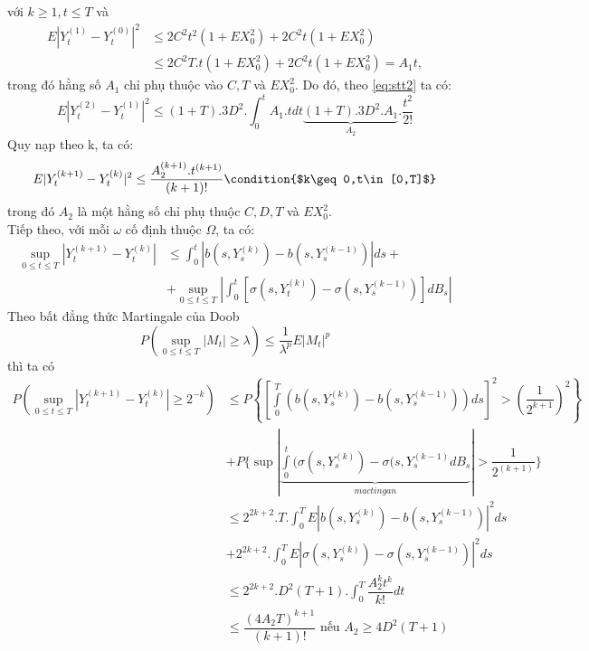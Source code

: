 \documentclass[14pt,a4paper]{article}
\numberwithin{equation}{section}
\begin{document}
với $k\geq 1,t\leq T$ và
\begin{equation*}
	\begin{split}
		E|Y^{(1)}_t-Y^{(0)}_t|^2&\leq 2C^2t^2(1+EX_0^2)+2C^2t(1+EX^2_0)\\
		&\leq 2C^2T.t(1+EX^2_0)+2C^2t(1+EX_0^2)=A_1t,
	\end{split}
\end{equation*}
trong đó hằng số $A_1$ chỉ phụ thuộc vào $C,T$ và $EX^2_0$. Do đó, theo \eqref{eq:stt2} ta có:
\begin{equation*}
	E|Y_t^{(2)}-Y_t^{(1)}|^2\leq(1+T).3D^2.\int_0^tA_1.tdt\underbrace{(1+T).3D^2.A_1}_{A_2}.\dfrac{t^2}{2!}
\end{equation*}
Quy nạp theo k, ta có:
\begin{equation}\label{eq:stt3}
	E|Y_t^{(k+1)}-Y_t^{(k)}|^2\leq\dfrac{A_2^{(k+1)}.t^{(k+1)}}{(k+1)!}\condition{$k\geq 0,t\in[0,T]$}
\end{equation}
trong đó $A_2$ là một hằng số chỉ phụ thuộc $C,D,T$ và $EX_0^2$.\\
Tiếp theo, với mỗi $\omega$ cố định thuộc $\Omega$, ta có:
\begin{equation*}
	\begin{split}
		\sup_{0\leq t\leq T}|Y_t^{(k+1)}-Y_t^{(k)}|&\leq\int_0^t|b(s,Y_s^{(k)})-b(s,Y_s^{(k-1)})|ds+\\
		&+\sup_{0\leq t\leq T}|\int_0^t[\sigma(s,Y_t^{(k)})-\sigma(s,Y_s^{(k-1)})]dB_s|
	\end{split}
\end{equation*}
Theo bất đẳng thức Martingale của Doob
\begin{equation*}
	P\left(\sup_{0\leq t\leq T}|M_t|\geq\lambda \right)\leq\dfrac{1}{\lambda^p}E|M_t|^p
\end{equation*}
thì ta có
\begin{equation*}
\begin{split}
P\left(\sup_{0\leq t\leq T}|Y_t^{(k+1)}-Y_t^{(k)}|\geq 2^{-k} \right)&\leq P\left\{\left[\int\limits_0^T(b(s,Y_s^{(k)})-b(s,Y_s^{(k-1)}))ds \right]^2>\left(\dfrac{1}{2^{k+1}}\right)^2 \right\}\\
&+P\{\sup{|\underbrace{\int\limits_0^t(\sigma(s,Y_s^{(k)})-\sigma(s,Y_s^{(k-1)}dB_s}_{mactingan}|}>\dfrac{1}{2^{(k+1)}} \}\\
&\leq	2^{2k+2}.T.\int_0^TE|b(s,Y_s^{(k)})-b(s,Y_s^{(k-1)})|^2ds\\
&+2^{2k+2}.\int_0^TE|\sigma(s,Y_s^{(k)})-\sigma(s,Y_s^{(k-1)})|^2ds\\
&\leq 2^{2k+2}.D^2(T+1).\int_0^T\dfrac{A_2^kt^k}{k!}dt\\
&\leq\dfrac{(4A_2T)^{k+1}}{(k+1)!}\text{ nếu }A_2\geq4D^2(T+1)
\end{split}
\end{equation*}
\end{document}
